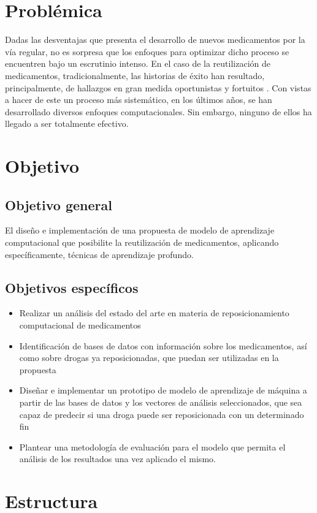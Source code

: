 \section*{Problémica}
Dadas las desventajas que presenta el desarrollo de nuevos medicamentos por la vía regular, no es sorpresa que los enfoques para optimizar dicho proceso se encuentren bajo un escrutinio intenso. En el caso de la reutilización de medicamentos, tradicionalmente, las historias de éxito han resultado, principalmente, de hallazgos en gran medida oportunistas y fortuitos \cite{drugfindings}. Con vistas a hacer de este un proceso más sistemático, en los últimos años, se han desarrollado diversos enfoques computacionales. Sin embargo, ninguno de ellos ha llegado a ser totalmente efectivo. 

\section*{Objetivo}
\subsection*{Objetivo general}
El diseño e implementación de una propuesta de modelo de aprendizaje computacional que posibilite la reutilización de medicamentos, aplicando específicamente, técnicas de aprendizaje profundo. 

\subsection*{Objetivos específicos}

\begin{itemize}
    \item Realizar un análisis del estado del arte en materia de reposicionamiento computacional de medicamentos
    \item Identificación de bases de datos con información sobre los medicamentos, así como sobre drogas ya reposicionadas, que puedan ser utilizadas en la propuesta
    \item Diseñar e implementar un prototipo de modelo de aprendizaje de máquina a partir de las bases de datos y los vectores de análisis seleccionados, que sea capaz de predecir si una droga puede ser reposicionada con un determinado fin
    \item Plantear una metodología de evaluación para el modelo que permita el análisis de los resultados una vez aplicado el mismo.
\end{itemize}

\section*{Estructura}